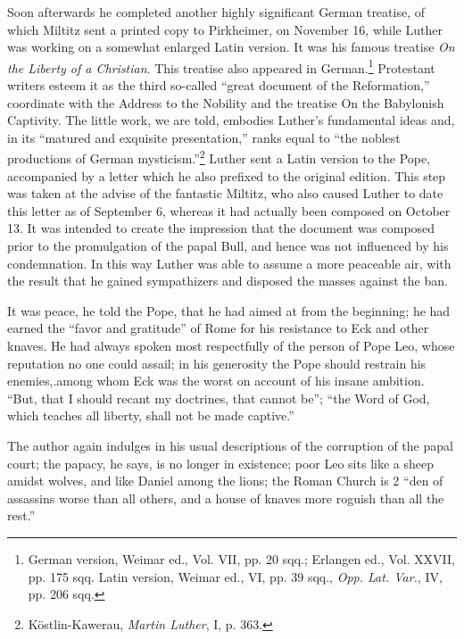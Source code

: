 Soon afterwards he completed another highly significant German
treatise, of which Miltitz sent a printed copy to Pirkheimer, on November
16, while Luther was working on a somewhat enlarged Latin
version. It was his famous treatise \textit{On the Liberty of a Christian}.
This treatise also appeared in German.\footnote
{German version, Weimar ed., Vol. VII, pp. 20 sqq.; Erlangen ed., Vol. XXVII, pp.
175 sqq. Latin version, Weimar ed., VI, pp. 39 sqq., \textit{Opp. Lat. Var.}, IV, pp. 206 sqq.}
Protestant writers esteem
it as the third so-called “great document of the Reformation,” coordinate
with the Address to the Nobility and the treatise On the
Babylonish Captivity. The little work, we are told, embodies Luther’s fundamental
ideas and, in its “matured and exquisite presentation,”
ranks equal to “the noblest productions of German mysticism.”\footnote{Köstlin-Kawerau, \textit{Martin Luther}, I, p. 363.}
Luther sent a Latin version to the Pope, accompanied by a
letter which he also prefixed to the original edition. This step was
taken at the advise of the fantastic Miltitz, who also caused Luther
to date this letter as of September 6, whereas it had actually been composed
on October 13. It was intended to create the impression that
the document was composed prior to the promulgation of the papal
Bull, and hence was not influenced by his condemnation. In this way
Luther was able to assume a more peaceable air, with the result that
he gained sympathizers and disposed the masses against the ban.

It was peace, he told the Pope, that he had aimed at from the beginning;
he had earned the “favor and gratitude” of Rome for his resistance to Eck
and other knaves. He had always spoken most respectfully of the person of
Pope Leo, whose reputation no one could assail; in his generosity the Pope
should restrain his enemies,.among whom Eck was the worst on account of
his insane ambition. “But, that I should recant my doctrines, that cannot
be”; “the Word of God, which teaches all liberty, shall not be made captive.”

The author again indulges in his usual descriptions of the corruption of
the papal court; the papacy, he says, is no longer in existence; poor Leo sits
like a sheep amidst wolves, and like Daniel among the lions; the Roman
Church is 2 “den of assassins worse than all others, and a house of knaves
more roguish than all the rest.”

